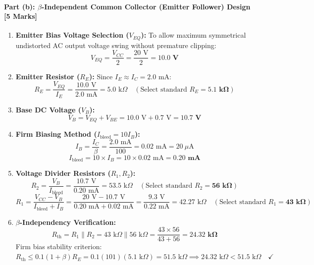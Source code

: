 \documentclass[11pt,a4paper,oneside]{book}
\begin{document}
\paragraph{Part (b): $\beta$-Independent Common Collector (Emitter Follower) Design [5 Marks]}
\begin{enumerate}[leftmargin=1.5em]
  \item \textbf{Emitter Bias Voltage Selection ($V_{EQ}$):}
  To allow maximum symmetrical undistorted AC output voltage swing without premature clipping:
  \[
  V_{EQ} = \frac{V_{CC}}{2} = \frac{20\text{ V}}{2} = \mathbf{10.0\text{ V}}
  \]
  \item \textbf{Emitter Resistor ($R_E$):}
  Since $I_E \approx I_C = 2.0\text{ mA}$:
  \[
  R_E = \frac{V_{EQ}}{I_E} = \frac{10.0\text{ V}}{2.0\text{ mA}} = 5.0\text{ k}\Omega \quad (\text{Select standard } R_E = \mathbf{5.1\text{ k}\Omega})
  \]
  \item \textbf{Base DC Voltage ($V_B$):}
  \[
  V_B = V_{EQ} + V_{BE} = 10.0\text{ V} + 0.7\text{ V} = \mathbf{10.7\text{ V}}
  \]
  \item \textbf{Firm Biasing Method ($I_{\text{bleed}} = 10 I_B$):}
  \[
  I_B = \frac{I_C}{\beta} = \frac{2.0\text{ mA}}{100} = 0.02\text{ mA} = 20\ \mu\text{A}
  \]
  \[
  I_{\text{bleed}} = 10 \times I_B = 10 \times 0.02\text{ mA} = \mathbf{0.20\text{ mA}}
  \]
  \item \textbf{Voltage Divider Resistors ($R_1, R_2$):}
  \[
  R_2 = \frac{V_B}{I_{\text{bleed}}} = \frac{10.7\text{ V}}{0.20\text{ mA}} = 53.5\text{ k}\Omega \quad (\text{Select standard } R_2 = \mathbf{56\text{ k}\Omega})
  \]
  \[
  R_1 = \frac{V_{CC} - V_B}{I_{\text{bleed}} + I_B} = \frac{20\text{ V} - 10.7\text{ V}}{0.20\text{ mA} + 0.02\text{ mA}} = \frac{9.3\text{ V}}{0.22\text{ mA}} = 42.27\text{ k}\Omega \quad (\text{Select standard } R_1 = \mathbf{43\text{ k}\Omega})
  \]
  \item \textbf{$\beta$-Independency Verification:}
  \[
  R_{\text{th}} = R_1 \parallel R_2 = 43\text{ k}\Omega \parallel 56\text{ k}\Omega = \frac{43 \times 56}{43 + 56} = \mathbf{24.32\text{ k}\Omega}
  \]
  Firm bias stability criterion: $R_{\text{th}} \le 0.1(1+\beta)R_E = 0.1(101)(5.1\text{ k}\Omega) = 51.5\text{ k}\Omega \implies 24.32\text{ k}\Omega < 51.5\text{ k}\Omega \quad \checkmark$
\end{enumerate}
\end{document}
